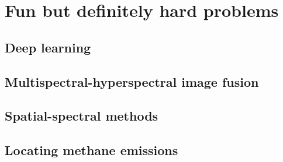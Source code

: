 \section{Fun but definitely hard problems}

\subsection{Deep learning}

\subsection{Multispectral-hyperspectral image fusion}

\subsection{Spatial-spectral methods}

\subsection{Locating methane emissions}